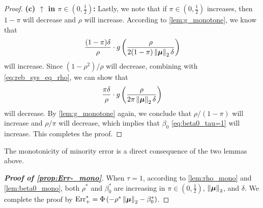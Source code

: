 \begin{proof}
\vspace{0.5\baselineskip}
\noindent
\textbf{(c) $\boldsymbol{\uparrow}$ in $\pi \in (0, \frac12)$:}
Lastly, we note that if $\pi \in (0, \frac12)$ increases, then $1 - \pi$ will decrease and $\rho$ will increase. According to \cref{lem:g_monotone}, we know that
\begin{equation*}
    \frac{(1 - \pi) \delta}{\rho} \cdot g \left( \frac{\rho}{2(1 - \pi) \left\|{\text{\boldmath $\mu$}}\right\|_2 \delta} \right)
\end{equation*}
will increase. Since $(1 - \rho^2)/\rho$ will decrease, combining with \cref{eq:reb_sys_eq_rho}, we can show that
\begin{equation*}
    \frac{\pi \delta}{\rho} \cdot g \left( \frac{\rho}{2 \pi \left\|{\text{\boldmath $\mu$}}\right\|_2 \delta} \right)
\end{equation*}
will decrease. By \cref{lem:g_monotone} again, we conclude that $\rho / (1 - \pi)$ will increase and $\rho / \pi$ will decrease, which implies that $\beta_0$ \cref{eq:beta0_tau=1} will increase. This completes the proof.
\end{proof}


The monotonicity of minority error is a direct consequence of the two lemmas above.
\begin{proof}[\textbf{Proof of \cref{prop:Err-_mono}}]
When $\tau = 1$, according to \cref{lem:rho_mono} and \ref{lem:beta0_mono}, both $\rho^*$ and $\beta_0^*$ are increasing in $\pi \in (0, \frac12)$, $\left\|{\text{\boldmath $\mu$}}\right\|_2$, and $\delta$. We complete the proof by $\mathrm{Err}_{+}^* = \Phi \left(- \rho^* \left\|{\text{\boldmath $\mu$}}\right\|_2 - \beta_0^* \right)$.
\end{proof}



